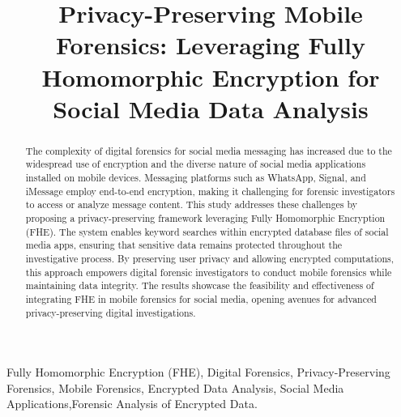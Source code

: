 \documentclass[conference]{IEEEtran}
\begin{document}
\title{Privacy-Preserving Mobile Forensics: Leveraging Fully Homomorphic Encryption for Social Media Data Analysis}

\author{
}

\maketitle

\begin{abstract}
The complexity of digital forensics for social media messaging has increased due to the widespread use of encryption and the diverse nature of social media applications installed on mobile devices. Messaging platforms such as WhatsApp, Signal, and iMessage employ end-to-end encryption, making it challenging for forensic investigators to access or analyze message content. This study addresses these challenges by proposing a privacy-preserving framework leveraging Fully Homomorphic Encryption (FHE). The system enables keyword searches within encrypted database files of social media apps, ensuring that sensitive data remains protected throughout the investigative process. By preserving user privacy and allowing encrypted computations, this approach empowers digital forensic investigators to conduct mobile forensics while maintaining data integrity. The results showcase the feasibility and effectiveness of integrating FHE in mobile forensics for social media, opening avenues for advanced privacy-preserving digital investigations.
\end{abstract}


\begin{IEEEkeywords}
Fully Homomorphic Encryption (FHE), Digital Forensics, Privacy-Preserving Forensics, Mobile Forensics, Encrypted Data Analysis, Social Media Applications,Forensic Analysis of Encrypted Data.
\end{IEEEkeywords}
\end{document}
